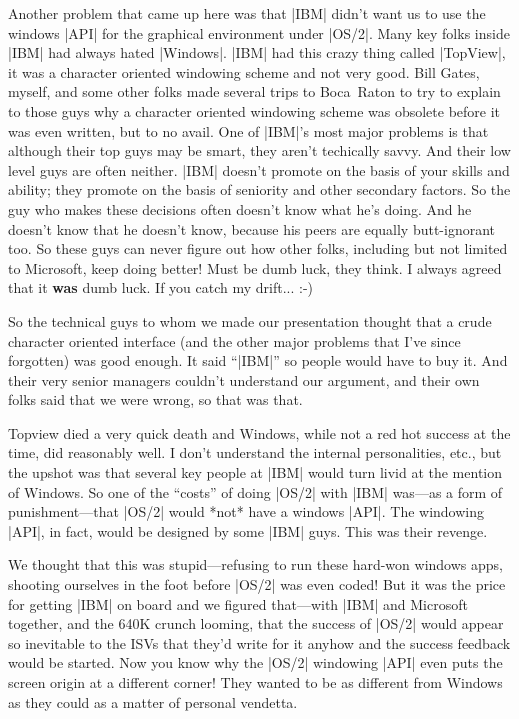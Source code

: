 Another problem that came up here was that |IBM| didn't want us to use the
windows |API| for the graphical environment under |OS/2|.  Many key folks
inside |IBM| had always hated |Windows|.  |IBM| had this crazy thing
called |TopView|,
it was a character oriented windowing scheme and not very good.  Bill Gates,
myself, and some other folks made several trips to Boca~Raton to try
to explain to those guys why a character oriented windowing scheme was
obsolete before it was even written, but to no avail.  One of |IBM|'s most
major problems is that although their top guys may be smart, they
aren't techically savvy.  And their low level guys are often neither.
|IBM| doesn't promote on the basis of your skills and ability; they promote
on the basis of seniority and other secondary factors.  So the guy
who makes these decisions often doesn't know what he's doing.  And he
doesn't know that he doesn't know, because his peers are equally
butt-ignorant too.  So these guys can never figure out how other folks, 
including but not limited to Microsoft, keep doing better!  Must be dumb luck, 
they think.  I always agreed that it {\bf was} dumb luck.  If you catch my
drift... :-)

So the technical guys to whom we made our presentation thought that
a crude character oriented interface (and the other major problems
that I've since forgotten) was good enough.  It said ``|IBM|'' so people would
have to buy it.  And their very senior managers couldn't understand our
argument, and their own folks said that we were wrong, so that was that.

Topview died a very quick death and Windows, while not a red hot success
at the time, did reasonably well.  I don't understand the internal
personalities, etc., but the upshot was that several key people at |IBM|
would turn livid at the mention of Windows.  So one of the ``costs'' of
doing |OS/2| with |IBM| was---as a form of punishment---that |OS/2| would
*not* have a windows |API|.  The windowing |API|, in fact, would be designed
by some |IBM| guys.  This was their revenge.

We thought that this was stupid---refusing to run
these hard-won windows apps, shooting ourselves in the foot before |OS/2|
was even coded!  But it was the price for getting |IBM| on board and we
figured that---with |IBM| and Microsoft together, and the 640K crunch
looming, that the success of |OS/2| would appear so inevitable to the ISVs that
they'd write for it anyhow and the success feedback would be started.
Now you know why the |OS/2| windowing |API| even puts the screen origin at
a different corner!  They wanted to be as different from Windows as they
could as a matter of personal vendetta.

